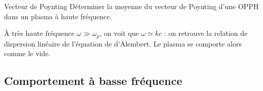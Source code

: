 \documentclass[12pt,fancy]{cours}
\begin{document}
  \begin{exemple}{Vecteur de Poynting}
    Déterminer la moyenne du vecteur de Poynting d'une OPPH dans un plasma à haute fréquence.
  \end{exemple}
      

      \begin{remarque}
        À très haute fréquence $\omega \gg \omega_p$, on voit que $\omega \simeq k c$ : on retrouve la relation de dispersion linéaire de l'équation de d'Alembert. Le plasma se comporte alors comme le vide.
      \end{remarque}
\subsection{Comportement à basse fréquence}
\label{sec:plasma_BF}
\end{document}

